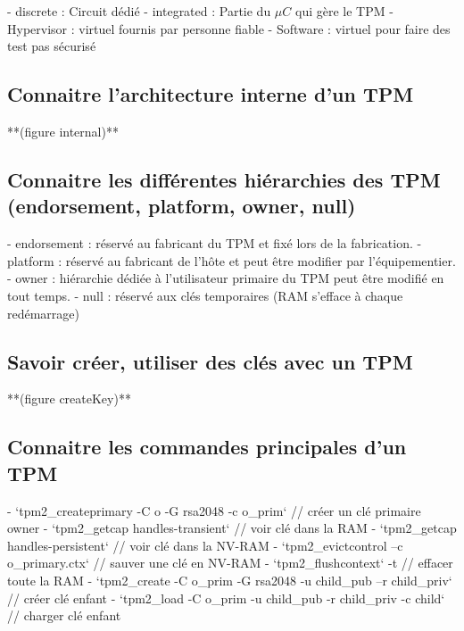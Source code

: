 \documentclass[resume]{uboot}
\begin{document}
- discrete : Circuit dédié 
- integrated : Partie du $\mu C$ qui gère le TPM
- Hypervisor : virtuel fournis par personne fiable
- Software : virtuel pour faire des test pas sécurisé

\subsection{Connaitre l’architecture interne d’un TPM}

**(figure internal)** 

\subsection{Connaitre les différentes hiérarchies des TPM (endorsement, platform, owner, null)}

- endorsement : réservé au fabricant du TPM et fixé lors de la fabrication.
- platform : réservé au fabricant de l'hôte et peut être modifier par l'équipementier.
- owner : hiérarchie dédiée à l'utilisateur primaire du TPM peut être modifié en tout temps.
- null : réservé aux clés temporaires (RAM s'efface à chaque redémarrage)

\subsection{Savoir créer, utiliser des clés avec un TPM}

**(figure createKey)** 

\subsection{Connaitre les commandes principales d’un TPM}

- `tpm2_createprimary -C o -G rsa2048 -c o_prim` // créer un clé primaire owner
- `tpm2_getcap handles-transient` // voir clé dans la RAM
- `tpm2_getcap handles-persistent` // voir clé dans la NV-RAM
- `tpm2_evictcontrol –c o_primary.ctx` // sauver une clé en NV-RAM
- `tpm2_flushcontext` -t // effacer toute la RAM
- `tpm2_create -C o_prim -G rsa2048 -u child_pub –r child_priv` // créer clé enfant
- `tpm2_load -C o_prim -u child_pub -r child_priv -c child` // charger clé enfant
\end{document}
